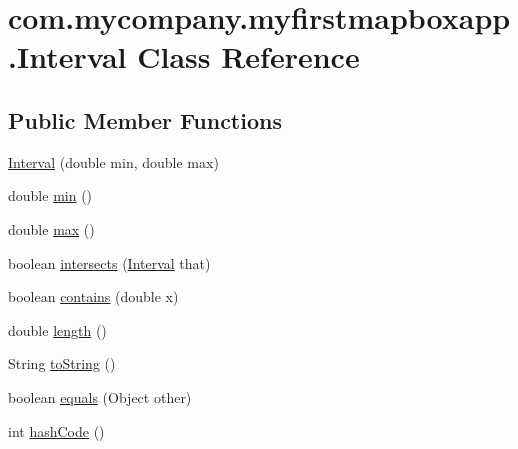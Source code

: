 \hypertarget{classcom_1_1mycompany_1_1myfirstmapboxapp_1_1_interval}{}\section{com.\+mycompany.\+myfirstmapboxapp.\+Interval Class Reference}
\label{classcom_1_1mycompany_1_1myfirstmapboxapp_1_1_interval}
\subsection*{Public Member Functions}
\begin{DoxyCompactItemize}
\item 
\hyperlink{classcom_1_1mycompany_1_1myfirstmapboxapp_1_1_interval_a2eccdd083583a2babcfea22b5a0f8053}{Interval} (double min, double max)
\item 
double \hyperlink{classcom_1_1mycompany_1_1myfirstmapboxapp_1_1_interval_ad537811e98caba58c27071acced4c252}{min} ()
\item 
double \hyperlink{classcom_1_1mycompany_1_1myfirstmapboxapp_1_1_interval_a8f959bd89864640b4febcbfebe376f31}{max} ()
\item 
boolean \hyperlink{classcom_1_1mycompany_1_1myfirstmapboxapp_1_1_interval_ac24fd0624aa6958bb802d1a0de58b1b3}{intersects} (\hyperlink{classcom_1_1mycompany_1_1myfirstmapboxapp_1_1_interval}{Interval} that)
\item 
boolean \hyperlink{classcom_1_1mycompany_1_1myfirstmapboxapp_1_1_interval_a4b110a2f87d5c8aed0f3854804483658}{contains} (double x)
\item 
double \hyperlink{classcom_1_1mycompany_1_1myfirstmapboxapp_1_1_interval_a82f9eaa6872674e15cfa61c649d7820b}{length} ()
\item 
String \hyperlink{classcom_1_1mycompany_1_1myfirstmapboxapp_1_1_interval_a2d2ebc28da1563c7a580aa30b4c20a36}{to\+String} ()
\item 
boolean \hyperlink{classcom_1_1mycompany_1_1myfirstmapboxapp_1_1_interval_a72bd85dfc2178a46e7822bf4396551d0}{equals} (Object other)
\item 
int \hyperlink{classcom_1_1mycompany_1_1myfirstmapboxapp_1_1_interval_a647f94b4cea335e3a5745b3ba123f71b}{hash\+Code} ()
\end{DoxyCompactItemize}



